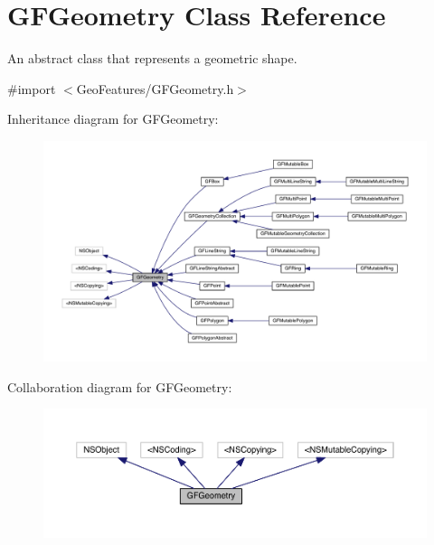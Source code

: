 \hypertarget{interface_g_f_geometry}{}\section{G\+F\+Geometry Class Reference}
\label{interface_g_f_geometry}


An abstract class that represents a geometric shape.  




{\ttfamily \#import $<$Geo\+Features/\+G\+F\+Geometry.\+h$>$}



Inheritance diagram for G\+F\+Geometry\+:\nopagebreak
\begin{figure}[H]
\begin{center}
\leavevmode
\includegraphics[width=350pt]{interface_g_f_geometry__inherit__graph}
\end{center}
\end{figure}


Collaboration diagram for G\+F\+Geometry\+:\nopagebreak
\begin{figure}[H]
\begin{center}
\leavevmode
\includegraphics[width=350pt]{interface_g_f_geometry__coll__graph}
\end{center}
\end{figure}
